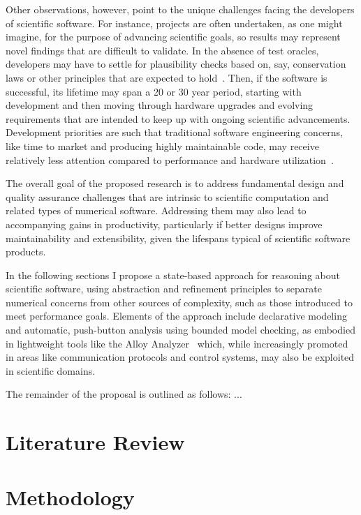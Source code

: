 \documentclass[11pt]{article}
\begin{document}
Other observations, however, point to the unique challenges facing the
developers of scientific software.  For instance, projects are often
undertaken, as one might imagine, for the purpose of advancing
scientific goals, so results may represent novel findings that are
difficult to validate.  In the absence of test oracles, developers may
have to settle for plausibility checks based on, say, conservation
laws or other principles that are expected to hold~\citep{storer2017}.
Then, if the software is successful, its lifetime may span a 20 or 30
year period, starting with development and then moving through
hardware upgrades and evolving requirements that are intended to keep
up with ongoing scientific advancements.  Development priorities are
such that traditional software engineering concerns, like time to
market and producing highly maintainable code, may receive relatively
less attention compared to performance and hardware
utilization~\citep{faulk2009}.

The overall goal of the proposed research is to address fundamental
design and quality assurance challenges that are intrinsic to
scientific computation and related types of numerical software.
Addressing them may also lead to accompanying gains in productivity,
particularly if better designs improve maintainability and
extensibility, given the lifespans typical of scientific software
products.

In the following sections I propose a state-based approach for reasoning about scientific software, using abstraction and refinement principles to separate numerical concerns from other sources of complexity, such as those introduced to meet performance goals.  Elements of the approach include declarative modeling and automatic, push-button analysis using bounded model checking, as embodied in lightweight tools like the Alloy Analyzer~\citep{jackson2012} which, while increasingly promoted in areas like communication protocols and control systems, may also be exploited in scientific domains.

The remainder of the proposal is outlined as follows: ...

\section{Literature Review}

\section{Methodology}
\end{document}
